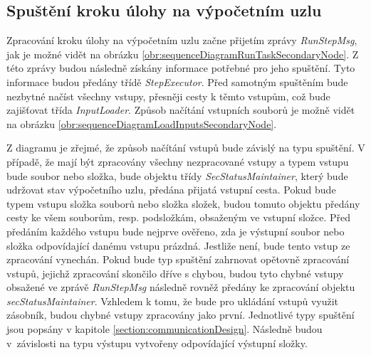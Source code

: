 \subsection*{Spuštění kroku úlohy na výpočetním uzlu}
\label{subsection:runStepOfTaskOnSecondaryNode}

Zpracování kroku úlohy na výpočetním uzlu začne přijetím zprávy \textit{RunStepMsg}, jak je možné vidět na obrázku \ref{obr:sequenceDiagramRunTaskSecondaryNode}. Z této zprávy budou následně získány informace potřebné pro jeho spuštění. Tyto informace budou předány třídě \textit{StepExecutor}. Před samotným spuštěním bude nezbytné načíst všechny vstupy, přesněji cesty k těmto vstupům, což bude zajišťovat třída \textit{InputLoader}. Způsob načítání vstupních souborů je možně vidět na obrázku \ref{obr:sequenceDiagramLoadInputsSecondaryNode}. 

Z diagramu je zřejmé, že způsob načítání vstupů bude závislý na typu spuštění. V případě, že mají být zpracovány všechny nezpracované vstupy a typem vstupu bude soubor nebo složka, bude objektu třídy \textit{SecStatusMaintainer}, který bude udržovat stav výpočetního uzlu, předána přijatá vstupní cesta. Pokud bude typem vstupu složka souborů nebo složka složek, budou tomuto objektu předány cesty ke všem souborům, resp. podsložkám, obsaženým ve vstupní složce. Před předáním každého vstupu bude nejprve ověřeno, zda je výstupní soubor nebo složka odpovídající danému vstupu prázdná. Jestliže není, bude tento vstup ze zpracování vynechán. Pokud bude typ spuštění zahrnovat opětovně zpracování vstupů, jejichž zpracování skončilo dříve s chybou, budou tyto chybné vstupy obsažené ve zprávě \textit{RunStepMsg} následně rovněž předány ke zpracování objektu \textit{secStatusMaintainer}. Vzhledem k tomu, že bude pro ukládání vstupů využit zásobník, budou chybné vstupy zpracovány jako první. Jednotlivé typy spuštění jsou popsány v kapitole \ref{section:communicationDesign}. Následně budou v~závislosti na typu výstupu vytvořeny odpovídající výstupní složky. 

